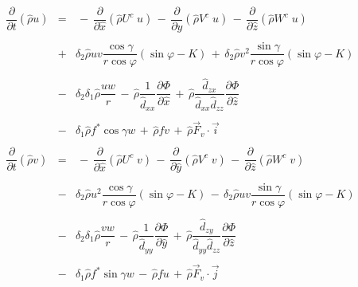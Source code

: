 \begin{eqnarray}
\dfrac{\partial}{\partial t}(\widehat{\rho}  u ) &= &
 \, - \, \dfrac{\partial }{\partial \widehat{x}} (\widehat{\rho} U^{c }\;    u )
 \, - \, \dfrac{\partial }{\partial \widehat{y}} (\widehat{\rho} V^{c } \;      u )
 \, - \, \dfrac{\partial }{\partial \widehat{z}} (\widehat{\rho} W^{c }\;     u )
\nonumber \\
& & \nonumber \\
&  + & \delta _{2}\widehat{\rho}  u   v  \dfrac{ \cos\gamma}{r \cos\varphi} (\sin\varphi -K)
\,+ \,\delta _{2}\widehat{\rho}  v ^{2}  \dfrac{ \sin\gamma  }{r \cos \varphi} (\sin\varphi -K)
\nonumber \\
& & \nonumber \\
 & - &\delta _{2}\delta _{1} \widehat{\rho}\dfrac{ u  w}{r} \,  - \, \widehat{\rho}\dfrac{1}{\widehat{d}_{xx}} \dfrac{\partial \Phi}{\partial \widehat{x}}
\, + \,\widehat{\rho}\dfrac{\widehat{d}_{zx}}{\widehat{d}_{xx}\widehat{d}_{zz}} \dfrac{\partial \Phi}{\partial \widehat{z}} \nonumber \\
& & \nonumber \\
&  - &\delta _{1} \widehat{\rho} f^{*} \cos\gamma w \, +  \, \widehat{\rho} f  v
\, + \, \widehat{\rho} \vec{F}_{v} \cdot \vec{i}
\\
& & \nonumber \\
\dfrac{\partial}{\partial t}(\widehat{\rho}  v ) &= &
 \, - \, \dfrac{\partial }{\partial \widehat{x}} (\widehat{\rho} U^{c }\;     v )
 \, - \, \dfrac{\partial }{\partial \widehat{y}} (\widehat{\rho} V^{c }\;     v )
 \, - \, \dfrac{\partial }{\partial \widehat{z}} (\widehat{\rho} W^{c }\;     v )
\nonumber \\ & & \nonumber \\
&  - & \delta _{2}\widehat{\rho}  u ^{2}  \dfrac{ \cos\gamma}{r \cos\varphi} (\sin\varphi -K)
 \, - \, \delta _{2}\widehat{\rho}  u   v   \dfrac{\sin\gamma}{r \cos \varphi} (\sin\varphi -K)
\nonumber \\ & & \nonumber \\
 & - & \delta _{2}\delta _{1} \widehat{\rho}\dfrac{ v  w}{r} \,  - \, \widehat{\rho}\dfrac{1}{\widehat{d}_{yy}} \dfrac{\partial \Phi}{\partial \widehat{y}}
 \, +  \, \widehat{\rho}\dfrac{\widehat{d}_{zy}}{\widehat{d}_{yy}\widehat{d}_{zz}} \dfrac{\partial \Phi}{\partial \widehat{z}} \nonumber \\
& & \nonumber \\
&  - &\delta _{1}\widehat{\rho} f^{*} \sin\gamma w  \, - \,  \widehat{\rho} f  u
 \, + \, \widehat{\rho} \vec{F}_{v} \cdot \vec{j}

\end{eqnarray}
